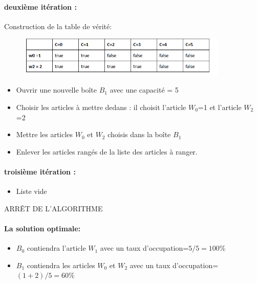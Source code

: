 \documentclass[12pt]{article}
\begin{document}
\paragraph{deuxième itération :}
Construction de la table de vérité:\linebreak
\begin{figure}[H]
  \includegraphics[width=10cm]{../figures/tabit2.png}
\end{figure}
\begin{itemize}
  \item Ouvrir une nouvelle boîte $B_1$ avec une capacité = 5
  \item Choisir les articles à mettre dedans : il choisit l’article $W_0$=1 et l’article $W_2$=2
  \item Mettre les articles $W_0$ et $W_2$ choisis dans la boîte $B_1$
  \item Enlever les articles rangés de la liste des articles à ranger. 
\end{itemize}
\paragraph{troisième itération :}
\begin{itemize}
    \item Liste vide
\end{itemize}
ARRÊT DE L’ALGORITHME
\paragraph{La solution optimale:}
\begin{itemize}
    \item $B_0$ contiendra l'article $W_1$ avec un taux d'occupation=$5/5 =100\%$
    \item $B_1$ contiendra les articles $W_0$ et $W_2$ avec un taux d'occupation=$ (1+2)/5 =  60\%$
  \end{itemize}
\end{document}
